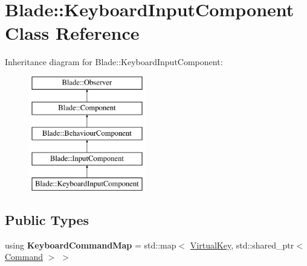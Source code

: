 \hypertarget{class_blade_1_1_keyboard_input_component}{}\section{Blade\+:\+:Keyboard\+Input\+Component Class Reference}
\label{class_blade_1_1_keyboard_input_component}
Inheritance diagram for Blade\+:\+:Keyboard\+Input\+Component\+:\begin{figure}[H]
\begin{center}
\leavevmode
\includegraphics[height=5.000000cm]{class_blade_1_1_keyboard_input_component}
\end{center}
\end{figure}
\subsection*{Public Types}
\begin{DoxyCompactItemize}
\item 
\mbox{\label{class_blade_1_1_keyboard_input_component_ae4c93cd11eba12bbf832b25977cd6ff4}} 
using {\bfseries Keyboard\+Command\+Map} = std\+::map$<$ \hyperlink{namespace_blade_a15d9bde4921fb2a9a953f8d97ea49d1c}{Virtual\+Key}, std\+::shared\+\_\+ptr$<$ \hyperlink{class_blade_1_1_command}{Command} $>$ $>$
\end{DoxyCompactItemize}
